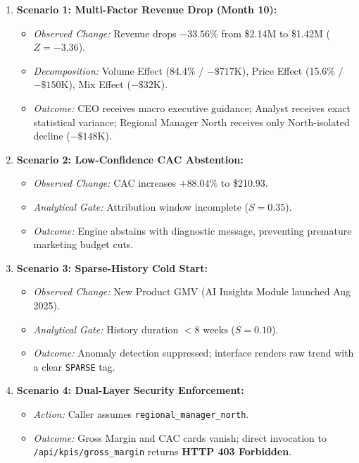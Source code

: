 \documentclass[11pt,a4paper]{article}
\begin{document}
\begin{enumerate}[leftmargin=*]
    \item \textbf{Scenario 1: Multi-Factor Revenue Drop (Month 10):}
    \begin{itemize}[noitemsep]
        \item \textit{Observed Change:} Revenue drops $-33.56\%$ from \$2.14M to \$1.42M ($Z = -3.36$).
        \item \textit{Decomposition:} Volume Effect (84.4\% / $-\$717\text{K}$), Price Effect (15.6\% / $-\$150\text{K}$), Mix Effect ($-\$32\text{K}$).
        \item \textit{Outcome:} CEO receives macro executive guidance; Analyst receives exact statistical variance; Regional Manager North receives only North-isolated decline ($-\$148\text{K}$).
    \end{itemize}
    
    \item \textbf{Scenario 2: Low-Confidence CAC Abstention:}
    \begin{itemize}[noitemsep]
        \item \textit{Observed Change:} CAC increases $+88.04\%$ to \$210.93.
        \item \textit{Analytical Gate:} Attribution window incomplete ($S = 0.35$).
        \item \textit{Outcome:} Engine abstains with diagnostic message, preventing premature marketing budget cuts.
    \end{itemize}

    \item \textbf{Scenario 3: Sparse-History Cold Start:}
    \begin{itemize}[noitemsep]
        \item \textit{Observed Change:} New Product GMV (AI Insights Module launched Aug 2025).
        \item \textit{Analytical Gate:} History duration $< 8\text{ weeks}$ ($S = 0.10$).
        \item \textit{Outcome:} Anomaly detection suppressed; interface renders raw trend with a clear \texttt{SPARSE} tag.
    \end{itemize}

    \item \textbf{Scenario 4: Dual-Layer Security Enforcement:}
    \begin{itemize}[noitemsep]
        \item \textit{Action:} Caller assumes \texttt{regional\_manager\_north}.
        \item \textit{Outcome:} Gross Margin and CAC cards vanish; direct invocation to \texttt{/api/kpis/gross\_margin} returns \textbf{HTTP 403 Forbidden}.
    \end{itemize}


\end{enumerate}
\end{document}
